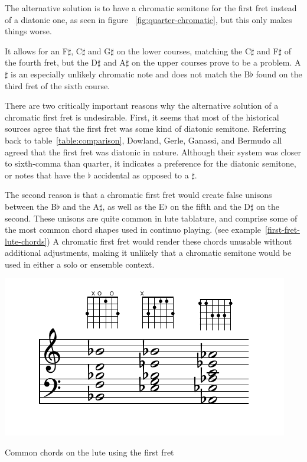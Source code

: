 The alternative solution is to have a chromatic semitone for the first fret instead of a
diatonic one, as seen in figure ~\ref{fig:quarter-chromatic}, but this only makes things
worse.

It allows for an F$\sharp$, C$\sharp$ and G$\sharp$ on the lower courses, matching the
C$\sharp$ and F$\sharp$ of the fourth fret, but the D$\sharp$ and A$\sharp$ on the
upper courses prove to be a problem. A$\sharp$ is an especially unlikely chromatic
note and does not match the B$\flat$ found on the third fret of the sixth course.

There are two critically important reasons why the alternative solution of a chromatic first fret is undesirable. First,
it seems that most of the historical sources agree that the first fret was some kind of diatonic semitone. Referring
back to table~\ref{table:comparison}, Dowland, Gerle, Ganassi, and Bermudo all agreed that the first fret was diatonic
in nature. Although their system was closer to sixth-comma than quarter, it indicates a preference for the diatonic
semitone, or notes that have the $\flat$ accidental as opposed to a $\sharp$.

The second reason is that a chromatic first fret would create false unisons between the B$\flat$ and the A$\sharp$, as
well as the E$\flat$ on the fifth and the D$\sharp$ on the second. These unisons are quite common in lute tablature, and
comprise some of the most common chord shapes used in continuo playing. (see example~\ref{first-fret-lute-chords}) A
chromatic first fret would render these chords unusable without additional adjustments, making it unlikely that a
chromatic semitone would be used in either a solo or ensemble context.

\begin{example}[h]
\centering
\includegraphics{examples/first-fret-lute-chords.pdf}
\caption{Common chords on the lute using the first fret}
\label{first-fret-lute-chords}
\end{example}

